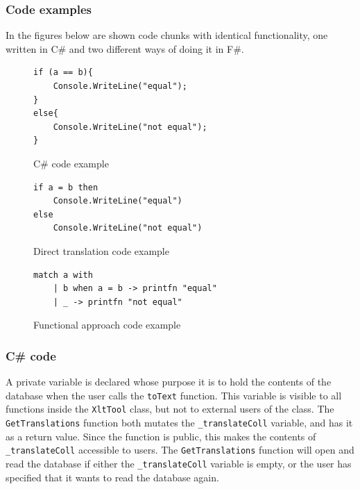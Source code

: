 \documentclass[12pt, a4paper]{article}
\newcommand{\code}[1]{{\small \texttt{#1}}}
\begin{document}
\newpage

\subsubsection{Code examples}
In the figures below are shown code chunks with identical functionality, one written in C\# and two different ways of doing it in F\#. 


\begin{figure}[!h]
\begin{lstlisting}
if (a == b){
	Console.WriteLine("equal");
}
else{
	Console.WriteLine("not equal");
}
\end{lstlisting}
\caption{C\# code example}
\label{fig:CSharpIf}
\end{figure}

\begin{figure}[!h]
\begin{lstlisting}
if a = b then 
	Console.WriteLine("equal")
else 
	Console.WriteLine("not equal")
\end{lstlisting}
\caption{Direct translation code example}
\label{fig:directTranslationIf}
\end{figure}

\begin{figure}[!h]
\begin{lstlisting}
match a with
    | b when a = b -> printfn "equal"
    | _ -> printfn "not equal"
\end{lstlisting}
\caption{Functional approach code example}
\label{fig:functionalApproachIf}
\end{figure}


\newpage

\subsubsection{C\# code}
A private variable is declared whose purpose it is to hold the contents of the database when the user calls the \code{toText} function. This variable is visible to all functions inside the \code{XltTool} class, but not to external users of the class. The \code{GetTranslations} function both mutates the \code{\_translateColl} variable, and has it as a return value. Since the function is public, this makes the contents of \code{\_translateColl} accessible to users. The \code{GetTranslations} function will open and read the database if either the \code{\_translateColl} variable is empty, or the user has specified that it wants to read the database again.
\end{document}
